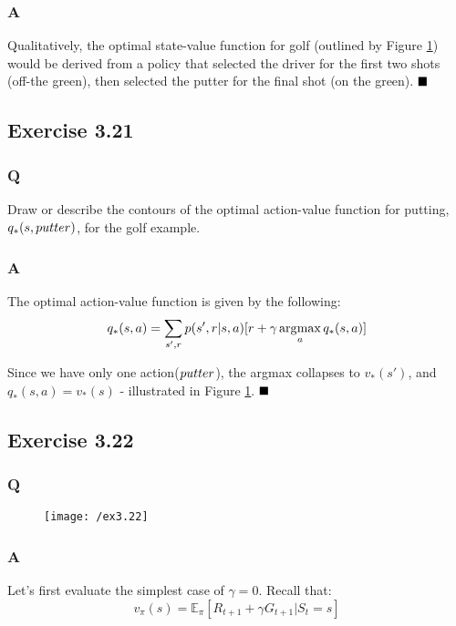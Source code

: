 \subsubsection*{A}
Qualitatively, the optimal state-value function for golf (outlined by Figure \ref{fig:3.20}) would be derived from a policy that selected the driver for the first two shots (off-the green), then selected the putter for the final shot (on the green).
$
\hfill \blacksquare
$

\subsection{Exercise 3.21}
\subsubsection*{Q}
Draw or describe the contours of the optimal action-value function for putting, $q_*(s, \mathnormal{putter})$, for the golf example.

\subsubsection*{A}
The optimal action-value function is given by the following:
\begin{equation}
q_*(s,a)= \sum_{s', r} p(s', r | s, a) [r + \gamma \operatorname*{\arg\!\max}_a q_*(s,a)]
\end{equation}

Since we have only one action($\mathnormal{putter}$), the argmax collapses to $v_*(s')$, and $q_*(s,a) = v_*(s)$ - illustrated in Figure \ref{fig:3.20}.
$
\hfill \blacksquare
$

\subsection{Exercise 3.22}
\subsubsection*{Q}
\begin{figure}[h!]
	\centering
	\texttt{[image: /ex3.22]}
	\label{fig:3.20}
\end{figure}

\subsubsection*{A}
Let's first evaluate the simplest case of $\gamma = 0$. Recall that:
\begin{equation}
v_\pi(s) = \mathbb{E}_\pi[R_{t+1} + \gamma G_{t+1} | S_t = s]
\end{equation}

